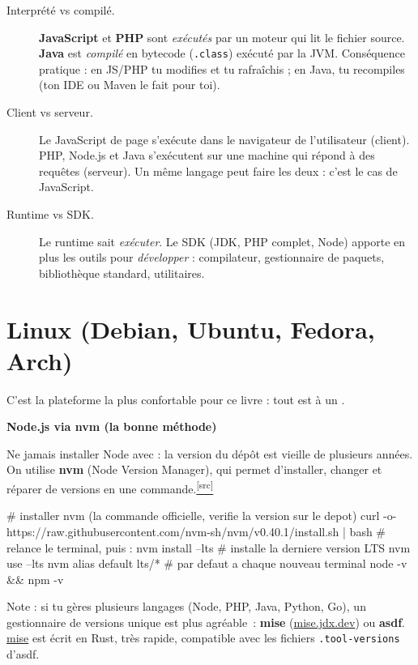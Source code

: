 \documentclass[12pt,a4paper,twoside,openright]{book}
\newcommand{\fichier}[1]{\texttt{\color{pathgreen}#1}}
\providecommand{\cmd}[1]{}%
\renewcommand{\cmd}[1]{\srcbox{\texttt{\detokenize{#1}}}}
\newcommand{\link}[2]{\href{#2}{#1}}
\newcommand{\src}[1]{\href{#1}{\textcolor{linkblue}{\textsuperscript{[src]}}}}
\newcommand{\langjs}{\textcolor{javared}{\textbf{JavaScript}}}
\newcommand{\langphp}{\textcolor{phppurple}{\textbf{PHP}}}
\newcommand{\langjava}{\textcolor{themecolor}{\textbf{Java}}}
\newcommand{\etape}[1]{\par\medskip\noindent\textbf{\large #1}\par\smallskip}
\begin{document}
\begin{description}
  \item[Interpr\'et\'e vs compil\'e.] \langjs{} et \langphp{} sont \emph{ex\'ecut\'es} par un moteur qui lit
        le fichier source. \langjava{} est \emph{compil\'e} en bytecode (\fichier{.class}) ex\'ecut\'e
        par la JVM. Cons\'equence pratique : en JS/PHP tu modifies et tu rafra\^ichis ; en Java,
        tu recompiles (ton IDE ou Maven le fait pour toi).
  \item[Client vs serveur.] Le JavaScript de page s'ex\'ecute dans le navigateur de l'utilisateur
        (client). PHP, Node.js et Java s'ex\'ecutent sur une machine qui r\'epond \`a des requ\^etes
        (serveur). Un m\^eme langage peut faire les deux : c'est le cas de JavaScript.
  \item[Runtime vs SDK.] Le runtime sait \emph{ex\'ecuter}. Le SDK (JDK, PHP complet, Node) apporte
        en plus les outils pour \emph{d\'evelopper} : compilateur, gestionnaire de paquets,
        biblioth\`eque standard, utilitaires.
\end{description}

\section{Linux (Debian, Ubuntu, Fedora, Arch)}

C'est la plateforme la plus confortable pour ce livre : tout est \`a un \cmd{apt install}.

\etape{Node.js via nvm (la bonne m\'ethode)}
Ne jamais installer Node avec \cmd{apt} : la version du d\'ep\^ot est vieille de plusieurs ann\'ees.
On utilise \textbf{nvm} (Node Version Manager), qui permet d'installer, changer et r\'eparer
de versions en une commande.\src{https://github.com/nvm-sh/nvm#installing-and-updating}

\begin{terminal}
# installer nvm (la commande officielle, verifie la version sur le depot)
curl -o- https://raw.githubusercontent.com/nvm-sh/nvm/v0.40.1/install.sh | bash
# relance le terminal, puis :
nvm install --lts          # installe la derniere version LTS
nvm use --lts
nvm alias default lts/*    # par defaut a chaque nouveau terminal
node -v && npm -v
\end{terminal}

Note : si tu g\`eres plusieurs langages (Node, PHP, Java, Python, Go), un gestionnaire de versions
unique est plus agr\'eable~: \textbf{mise} (\link{mise.jdx.dev}{https://mise.jdx.dev/}) ou
\textbf{asdf}. \link{mise}{https://github.com/jdx/mise} est \'ecrit en Rust, tr\`es rapide, compatible
avec les fichiers \fichier{.tool-versions} d'asdf.
\end{document}
